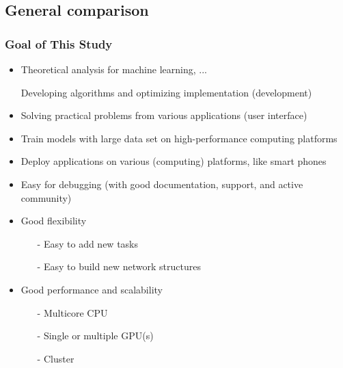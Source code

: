 \subsection{General comparison}


\begin{frame}
  \MyLogo
  \frametitle{Goal of This Study}  
\small

\medskip
{}
\begin{itemize}
\item Theoretical analysis for machine learning, ...
\item[\raisebox{-0.4ex}{\alert{\HandRight}}] Developing algorithms and optimizing implementation (development)
\item Solving practical problems from various applications (user interface)
\end{itemize}

\begin{itemize}
\item Train models with large data set on high-performance computing platforms
\item Deploy applications on various (computing) platforms, like smart phones
\end{itemize}

\begin{itemize}
\item Easy for debugging (with good \alert{documentation}, \alert{support}, and active community)
\item Good flexibility
	\begin{itemize}\scriptsize
	\item[-] Easy to add new tasks
	\item[-] Easy to build new network structures
	\end{itemize}
\item Good performance and scalability
	\begin{itemize}\scriptsize
	\item[-] Multicore CPU
	\item[-] \alert{Single} or \alert{multiple} GPU(s)
	\item[-] Cluster
	\end{itemize}
\end{itemize}

\end{frame}


